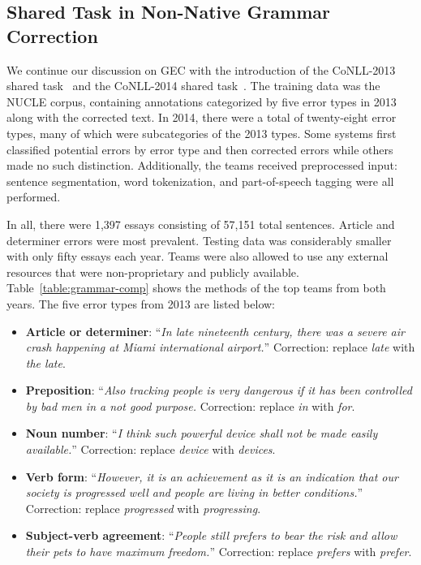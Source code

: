 \subsection{Shared Task in Non-Native Grammar Correction}
\label{subsec:grammar-shared}

We continue our discussion on GEC with the introduction of the
CoNLL-2013 shared task~\cite{2013-task-all} and the CoNLL-2014 shared task~\cite{2014-task-all}. The training data was the NUCLE
corpus, containing annotations categorized by five error types in 2013 along
with the corrected text. In 2014, there were a total of twenty-eight error
types, many of which were subcategories of the 2013 types. Some systems first
classified potential errors by error type and then corrected errors while others
made no such distinction. Additionally, the teams received preprocessed input:
sentence segmentation, word tokenization, and part-of-speech tagging were all
performed.

In all, there were 1,397 essays consisting of 57,151 total sentences. Article
and determiner errors were most prevalent. Testing data was considerably smaller
with only fifty essays each year. Teams were also allowed to use any external
resources that were non-proprietary and publicly available.
Table~\ref{table:grammar-comp} shows the methods of the top teams from both
years. The five error types from 2013 are listed below:

\begin{itemize}
    \item \textbf{Article or determiner}: ``\emph{In late nineteenth century,
        there was a severe air crash happening at Miami international
        airport.}'' Correction: replace \emph{late} with \emph{the late}.
    \item \textbf{Preposition}: ``\emph{Also tracking people is very dangerous
        if it has been controlled by bad men in a not good purpose.} Correction:
        replace \emph{in} with \emph{for}.
    \item \textbf{Noun number}: ``\emph{I think such powerful device shall not
        be made easily available.}'' Correction: replace \emph{device} with
        \emph{devices}.
    \item \textbf{Verb form}: ``\emph{However, it is an achievement as it is an
        indication that our society is progressed well and people are living in
        better conditions.}'' Correction: replace \emph{progressed} with
        \emph{progressing}.
    \item \textbf{Subject-verb agreement}: ``\emph{People still prefers to bear
        the risk and allow their pets to have maximum freedom.}'' Correction:
        replace \emph{prefers} with \emph{prefer}.
\end{itemize}

